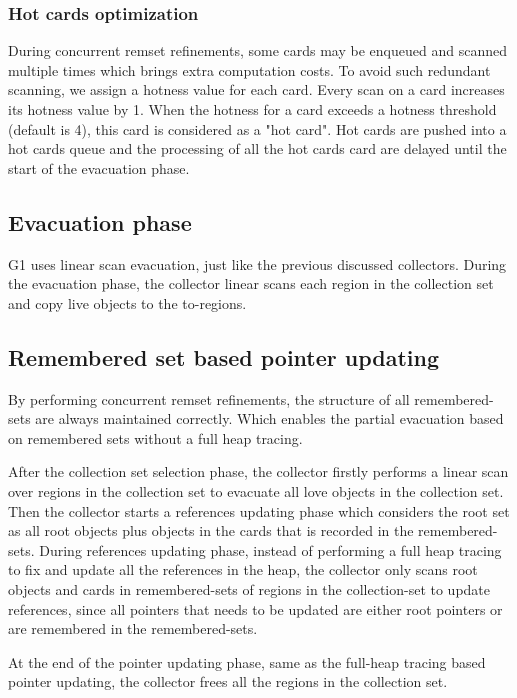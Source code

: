 \subsubsection{Hot cards optimization}

During concurrent remset refinements, some cards may be enqueued and scanned multiple times
which brings extra computation costs. To avoid such redundant scanning, we assign
a hotness value for each card. Every scan on a card increases its hotness value by 1.
When the hotness for a card exceeds a hotness threshold (default is 4), this card is considered
as a "hot card". Hot cards are pushed into a hot cards queue and the processing
of all the hot cards card are delayed until the start of the evacuation phase.

\subsection{Evacuation phase}

G1 uses linear scan evacuation, just like the previous discussed collectors.
During the evacuation phase, the collector linear scans each region in the collection
set and copy live objects to the to-regions.

\subsection{Remembered set based pointer updating}

By performing concurrent remset refinements, the structure of all remembered-sets are always maintained correctly.
Which enables the partial evacuation based on remembered sets without a full heap tracing.

After the collection set selection phase, the collector firstly performs a linear
scan over regions in the collection set to evacuate all love objects in the collection set.
Then the collector starts a references updating phase which considers
the root set as all root objects plus objects in the cards that is recorded in the remembered-sets.
During references updating phase, instead of performing a full heap tracing to fix and
update all the references in the heap, the collector only scans root objects and
cards in remembered-sets of regions in the collection-set to update references,
since all pointers that needs to be updated are either root pointers or are remembered in the remembered-sets.

At the end of the pointer updating phase, same as the full-heap tracing based
pointer updating, the collector frees all the regions in the collection set.

